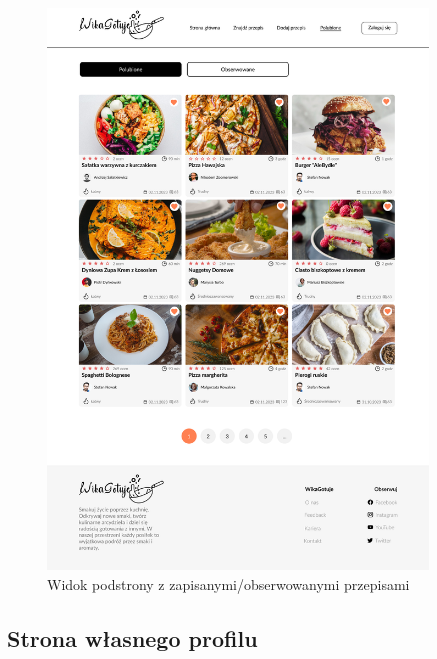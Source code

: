 \documentclass{article}
\begin{document}
\begin{figure}[H]
    \begin{center}
        \includegraphics[width=0.9\textwidth]{mockups/saved_recipies}
    \end{center}
    \caption{Widok podstrony z zapisanymi/obserwowanymi przepisami}
\end{figure}

\newpage

\subsection{Strona własnego profilu}
\end{document}
